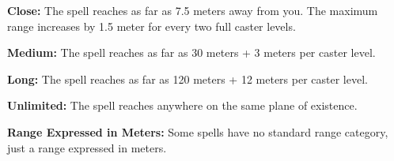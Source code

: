 \textbf{Close:} The spell reaches as far as 7.5 meters away from you. The maximum range increases by 1.5 meter for every two full caster levels.

\textbf{Medium:} The spell reaches as far as 30 meters + 3 meters per caster level.

\textbf{Long:} The spell reaches as far as 120 meters + 12 meters per caster level.

\textbf{Unlimited:} The spell reaches anywhere on the same plane of existence.

\textbf{Range Expressed in Meters:} Some spells have no standard range category, just a range expressed in meters.